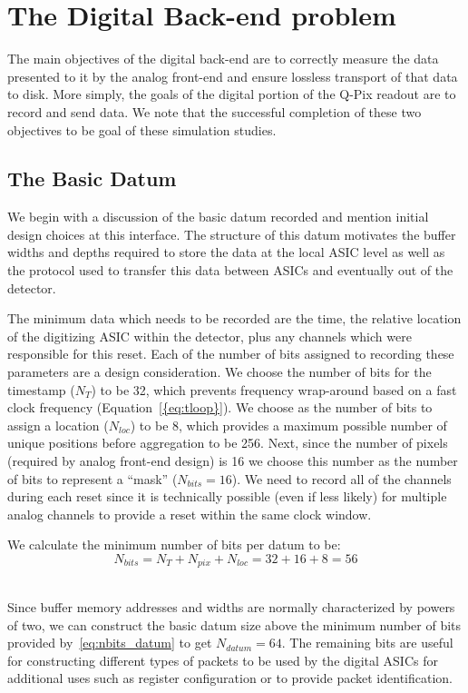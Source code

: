 \section{The Digital Back-end problem}

The main objectives of the digital back-end are to correctly measure the data presented to it by the analog front-end and ensure lossless transport of that data to disk.
More simply, the goals of the digital portion of the Q-Pix readout are to record and send data.
We note that the successful completion of these two objectives to be goal of these simulation studies.

\subsection{The Basic Datum}

We begin with a discussion of the basic datum recorded and mention initial design choices at this interface.
The structure of this datum motivates the buffer widths and depths required to store the data at the local ASIC level as well as the protocol used to transfer this data between ASICs and eventually out of the detector.

The minimum data which needs to be recorded are the time, the relative location of the digitizing ASIC within the detector, plus any channels which were responsible for this reset.
Each of the number of bits assigned to recording these parameters are a design consideration.
We choose the number of bits for the timestamp ($N_{T}$) to be 32, which prevents frequency wrap-around based on a fast clock frequency (Equation~\ref{{eq:tloop}}).
We choose as the number of bits to assign a location ($N_{loc}$) to be 8, which provides a maximum possible number of unique positions before aggregation to be 256.
Next, since the number of pixels (required by analog front-end design) is 16 we choose this number as the number of bits to represent a ``mask'' ($N_{bits} = 16$).
We need to record all of the channels during each reset since it is technically possible (even if less likely) for multiple analog channels to provide a reset within the same clock window.

We calculate the minimum number of bits per datum to be:
\begin{equation}
  N_{bits} = N_{T} + N_{pix} + N_{loc} = 32 + 16 + 8 = 56
\end{equation}~\label{eq:nbits_datum}

Since buffer memory addresses and widths are normally characterized by powers of two, we can construct the basic datum size above the minimum number of bits provided by~\ref{eq:nbits_datum} to get $N_{datum} = 64$.
The remaining bits are useful for constructing different types of packets to be used by the digital ASICs for additional uses such as register configuration or to provide packet identification.

